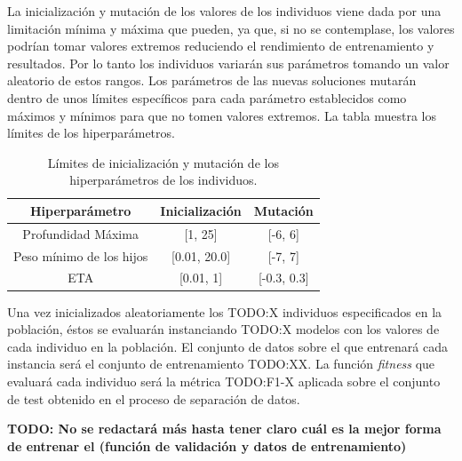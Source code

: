         La inicialización y mutación de los valores de los individuos viene dada por una limitación mínima y máxima que pueden, ya que, si no se contemplase, los valores podrían tomar valores extremos reduciendo el rendimiento de entrenamiento y resultados. Por lo tanto los individuos variarán sus parámetros tomando un valor aleatorio de estos rangos.  Los parámetros de las nuevas soluciones mutarán dentro de unos límites específicos para cada parámetro establecidos como máximos y mínimos para que no tomen valores extremos. La tabla \cite{InitAndMutationLimitsHyperparamsTable} muestra los límites de los hiperparámetros.

        \begin{table}[H]
            \centering
                \begin{tabular}{ |c|c|c| } 
                \hline
                \textbf{Hiperparámetro} & \textbf{Inicialización} & \textbf{Mutación}\\
                \hline
                    Profundidad Máxima & [1, 25] & [-6, 6]\\ 
                    Peso mínimo de los hijos & [0.01, 20.0] & [-7, 7] \\ 
                    ETA & [0.01, 1] &  [-0.3, 0.3] \\ 
                \hline

                \end{tabular}

            \caption{Límites de inicialización y mutación de los hiperparámetros de los individuos.}
            \label{InitAndMutationLimitsHyperparamsTable}
        \end{table}

        Una vez inicializados aleatoriamente los TODO:X individuos especificados en la población, éstos se evaluarán instanciando TODO:X modelos con los valores de cada individuo en la población. El conjunto de datos sobre el que entrenará cada instancia  será el conjunto de entrenamiento TODO:XX. La función \textit{fitness} que evaluará cada individuo será la métrica TODO:F1-X aplicada sobre el conjunto de test obtenido en el proceso de separación de datos.

        \textbf{TODO: No se redactará más hasta tener claro cuál es la mejor forma de entrenar el  (función de validación y datos de entrenamiento)}





